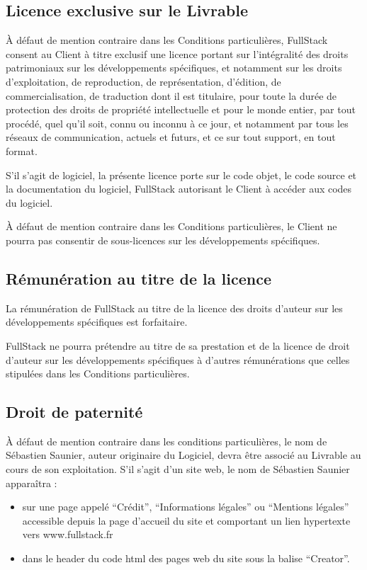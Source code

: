 \documentclass[11pt]{article}
\begin{document}
\subsection{Licence exclusive sur le Livrable}

À défaut de mention contraire dans les Conditions particulières, FullStack consent au Client à titre exclusif une licence portant sur l’intégralité des droits patrimoniaux sur les développements spécifiques, et notamment sur les droits d’exploitation, de reproduction, de représentation, d’édition, de commercialisation, de traduction dont il est titulaire, pour toute la durée de protection des droits de propriété intellectuelle et pour le monde entier, par tout procédé, quel qu’il soit, connu ou inconnu à ce jour, et notamment par tous les réseaux de communication, actuels et futurs, et ce sur tout support, en tout format.

S’il s’agit de logiciel, la présente licence porte sur le code objet, le code source et la documentation du logiciel, FullStack autorisant le Client à accéder aux codes du logiciel.

À défaut de mention contraire dans les Conditions particulières, le Client ne pourra pas consentir de sous-licences sur les développements spécifiques.

\subsection{Rémunération au titre de la licence}

La rémunération de FullStack au titre de la licence des droits d’auteur sur les développements spécifiques est forfaitaire.

FullStack ne pourra prétendre au titre de sa prestation et de la licence de droit d’auteur sur les développements spécifiques à d’autres rémunérations que celles stipulées dans les Conditions particulières.

\subsection{Droit de paternité}

À défaut de mention contraire dans les conditions particulières, le nom de Sébastien Saunier, auteur originaire du Logiciel, devra être associé au Livrable au cours de son exploitation. S’il s’agit d’un site web, le nom de Sébastien Saunier apparaîtra :

\begin{itemize}
  \item sur une page appelé ``Crédit'', ``Informations légales'' ou ``Mentions légales'' accessible depuis la page d’accueil du site et comportant un lien hypertexte vers www.fullstack.fr
  \item dans le header du code html des pages web du site sous la balise ``Creator''.
\end{itemize}
\end{document}
